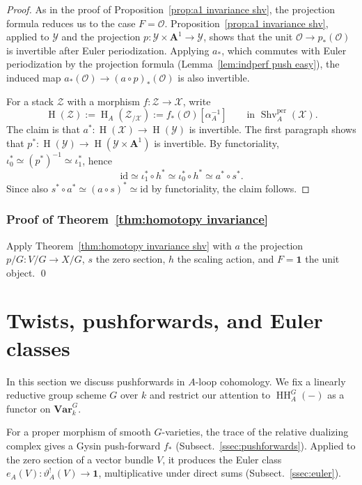 \documentclass[12pt, oneside]{amsart}
\numberwithin{equation}{section}
\theoremstyle{remark}
\theoremstyle{plain}
\newcommand{\OO}{\mathcal{O}}
\newcommand{\YY}{\mathcal{Y}}
\newcommand{\ZZ}{\mathcal{Z}}
\newcommand{\XX}{\mathcal{X}}
\newcommand{\Var}{\mathbf{Var}_{k}}
\newcommand{\id}{\mathrm{id}}
\newcommand{\aff}{\mathbf{A}^1}
\newcommand{\HH}{\operatorname{HH}}
\newcommand{\Hcoh}{\operatorname{H}}
\newcommand{\Shvper}{\operatorname{Shv}^{\mathrm{per}}}
\newcommand{\un}{\mathbf{1}}
\begin{document}
\begin{proof}
As in the proof of Proposition~\ref{prop:a1 invariance shv}, the projection formula reduces us to the case $F = \OO$.
Proposition~\ref{prop:a1 invariance shv}, applied to $\YY$ and the projection $p : \YY \times \aff \to \YY$, shows that the unit $\OO \to p_*(\OO)$ is invertible after Euler periodization.
Applying $a_*$, which commutes with Euler periodization by the projection formula (Lemma~\ref{lem:indperf push easy}), the induced map $a_*(\OO) \to (a \circ p)_*(\OO)$ is also invertible.

For a stack $\ZZ$ with a morphism $f : \ZZ \to \XX$, write
\[
  \Hcoh(\ZZ) := \Hcoh_A(\ZZ_{/\XX}) := f_*(\OO)[\alpha_A^{-1}]
  \qquad \text{in } \Shvper_A(\XX).
\]
The claim is that $a^* : \Hcoh(\XX) \to \Hcoh(\YY)$ is invertible.
The first paragraph shows that $p^* : \Hcoh(\YY) \to \Hcoh(\YY \times \aff)$ is invertible.
By functoriality, $\iota_0^* \simeq (p^*)^{-1} \simeq \iota_1^*$, hence
\[ \id \simeq \iota_1^* \circ h^* \simeq \iota_0^* \circ h^* \simeq a^*\circ s^*. \]
Since also $s^* \circ a^* \simeq (a \circ s)^* \simeq \id$ by functoriality, the claim follows.
\end{proof}

\subsubsection{Proof of Theorem~\ref{thm:homotopy invariance}}

Apply Theorem~\ref{thm:homotopy invariance shv} with $a$ the projection $p/G : V/G \to X/G$, $s$ the zero section, $h$ the scaling action, and $F=\un$ the unit object.
\qed

\section{Twists, pushforwards, and Euler classes}
\label{sec:pushforwards}

In this section we discuss pushforwards in $A$-loop cohomology.
We fix a linearly reductive group scheme $G$ over $k$ and restrict our attention to $\HH_A^G(-)$ as a functor on $\Var^G$.

For a proper morphism of smooth $G$-varieties, the trace of the relative dualizing complex gives a Gysin push-forward $f_*$ (Subsect.~\ref{ssec:pushforwards}). Applied to the zero section of a vector bundle $V$, it produces the Euler class $e_A(V) : \vartheta^!_A(V) \to \un$, multiplicative under direct sums (Subsect.~\ref{ssec:euler}).
\end{document}
